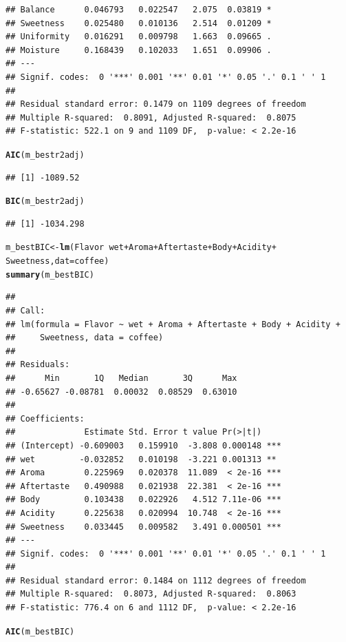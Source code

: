 \documentclass[oneside]{book}\usepackage[]{graphicx}\usepackage[dvipsnames,table,xcdraw]{xcolor}
\makeatletter
\newcommand{\hlopt}[1]{\textcolor[rgb]{0,0,0}{#1}}%
\newcommand{\hlstd}[1]{\textcolor[rgb]{0.345,0.345,0.345}{#1}}%
\newcommand{\hlkwb}[1]{\textcolor[rgb]{0.69,0.353,0.396}{#1}}%
\newcommand{\hlkwc}[1]{\textcolor[rgb]{0.333,0.667,0.333}{#1}}%
\newcommand{\hlkwd}[1]{\textcolor[rgb]{0.737,0.353,0.396}{\textbf{#1}}}%
\newenvironment{kframe}{%
 \def\at@end@of@kframe{}%
 \ifinner\ifhmode%
  \def\at@end@of@kframe{\end{minipage}}%
  \begin{minipage}{\columnwidth}%
 \fi\fi%
 \def\FrameCommand##1{\hskip\@totalleftmargin \hskip-\fboxsep
 \colorbox{shadecolor}{##1}\hskip-\fboxsep
     \hskip-\linewidth \hskip-\@totalleftmargin \hskip\columnwidth}%
 \MakeFramed {\advance\hsize-\width
   \@totalleftmargin\z@ \linewidth\hsize
   \@setminipage}}%
 {\par\unskip\endMakeFramed%
 \at@end@of@kframe}
\newenvironment{knitrout}{}{} %
\makeatother
\begin{document}
\begin{knitrout}
\begin{kframe}
\begin{verbatim}
## Balance      0.046793   0.022547   2.075  0.03819 *  
## Sweetness    0.025480   0.010136   2.514  0.01209 *  
## Uniformity   0.016291   0.009798   1.663  0.09665 .  
## Moisture     0.168439   0.102033   1.651  0.09906 .  
## ---
## Signif. codes:  0 '***' 0.001 '**' 0.01 '*' 0.05 '.' 0.1 ' ' 1
## 
## Residual standard error: 0.1479 on 1109 degrees of freedom
## Multiple R-squared:  0.8091,	Adjusted R-squared:  0.8075 
## F-statistic: 522.1 on 9 and 1109 DF,  p-value: < 2.2e-16
\end{verbatim}
\begin{alltt}
\hlkwd{AIC}\hlstd{(m_bestr2adj)}
\end{alltt}
\begin{verbatim}
## [1] -1089.52
\end{verbatim}
\begin{alltt}
\hlkwd{BIC}\hlstd{(m_bestr2adj)}
\end{alltt}
\begin{verbatim}
## [1] -1034.298
\end{verbatim}
\begin{alltt}
\hlstd{m_bestBIC} \hlkwb{<-} \hlkwd{lm}\hlstd{(Flavor} \hlopt{~} \hlstd{wet} \hlopt{+} \hlstd{Aroma} \hlopt{+} \hlstd{Aftertaste} \hlopt{+} \hlstd{Body} \hlopt{+} \hlstd{Acidity} \hlopt{+}
  \hlstd{Sweetness,} \hlkwc{dat} \hlstd{= coffee)}
\hlkwd{summary}\hlstd{(m_bestBIC)}
\end{alltt}
\begin{verbatim}
## 
## Call:
## lm(formula = Flavor ~ wet + Aroma + Aftertaste + Body + Acidity + 
##     Sweetness, data = coffee)
## 
## Residuals:
##      Min       1Q   Median       3Q      Max 
## -0.65627 -0.08781  0.00032  0.08529  0.63010 
## 
## Coefficients:
##              Estimate Std. Error t value Pr(>|t|)    
## (Intercept) -0.609003   0.159910  -3.808 0.000148 ***
## wet         -0.032852   0.010198  -3.221 0.001313 ** 
## Aroma        0.225969   0.020378  11.089  < 2e-16 ***
## Aftertaste   0.490988   0.021938  22.381  < 2e-16 ***
## Body         0.103438   0.022926   4.512 7.11e-06 ***
## Acidity      0.225638   0.020994  10.748  < 2e-16 ***
## Sweetness    0.033445   0.009582   3.491 0.000501 ***
## ---
## Signif. codes:  0 '***' 0.001 '**' 0.01 '*' 0.05 '.' 0.1 ' ' 1
## 
## Residual standard error: 0.1484 on 1112 degrees of freedom
## Multiple R-squared:  0.8073,	Adjusted R-squared:  0.8063 
## F-statistic: 776.4 on 6 and 1112 DF,  p-value: < 2.2e-16
\end{verbatim}
\begin{alltt}
\hlkwd{AIC}\hlstd{(m_bestBIC)}

\end{alltt}
\end{kframe}
\end{knitrout}
\end{document}
